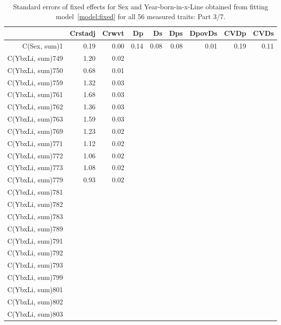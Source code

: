 \begin{table}[p]
\centering
\caption{Standard errors of fixed effects for Sex and Year-born-in-x-Line obtained from fitting model~\ref{model:fixed} for all 56 measured traits: Part 3/7.}
\label{tab:seb3}
\begin{tabular}{rrrrrrrrr}
  \hline
 & Crstadj & Crwvt & Dp & Ds & Dps & DpovDs & CVDp & CVDs \\ 
  \hline
C(Sex, sum)1 & 0.19 & 0.00 & 0.14 & 0.08 & 0.08 & 0.01 & 0.19 & 0.11 \\ 
  C(YbxLi, sum)749 & 1.20 & 0.02 &  &  &  &  &  &  \\ 
  C(YbxLi, sum)750 & 0.68 & 0.01 &  &  &  &  &  &  \\ 
  C(YbxLi, sum)759 & 1.32 & 0.03 &  &  &  &  &  &  \\ 
  C(YbxLi, sum)761 & 1.68 & 0.03 &  &  &  &  &  &  \\ 
  C(YbxLi, sum)762 & 1.36 & 0.03 &  &  &  &  &  &  \\ 
  C(YbxLi, sum)763 & 1.59 & 0.03 &  &  &  &  &  &  \\ 
  C(YbxLi, sum)769 & 1.23 & 0.02 &  &  &  &  &  &  \\ 
  C(YbxLi, sum)771 & 1.12 & 0.02 &  &  &  &  &  &  \\ 
  C(YbxLi, sum)772 & 1.06 & 0.02 &  &  &  &  &  &  \\ 
  C(YbxLi, sum)773 & 1.08 & 0.02 &  &  &  &  &  &  \\ 
  C(YbxLi, sum)779 & 0.93 & 0.02 &  &  &  &  &  &  \\ 
  C(YbxLi, sum)781 &  &  &  &  &  &  &  &  \\ 
  C(YbxLi, sum)782 &  &  &  &  &  &  &  &  \\ 
  C(YbxLi, sum)783 &  &  &  &  &  &  &  &  \\ 
  C(YbxLi, sum)789 &  &  &  &  &  &  &  &  \\ 
  C(YbxLi, sum)791 &  &  &  &  &  &  &  &  \\ 
  C(YbxLi, sum)792 &  &  &  &  &  &  &  &  \\ 
  C(YbxLi, sum)793 &  &  &  &  &  &  &  &  \\ 
  C(YbxLi, sum)799 &  &  &  &  &  &  &  &  \\ 
  C(YbxLi, sum)801 &  &  &  &  &  &  &  &  \\ 
  C(YbxLi, sum)802 &  &  &  &  &  &  &  &  \\ 
  C(YbxLi, sum)803 &  &  &  &  &  &  &  &  \\ 

\end{tabular}
\end{table}
